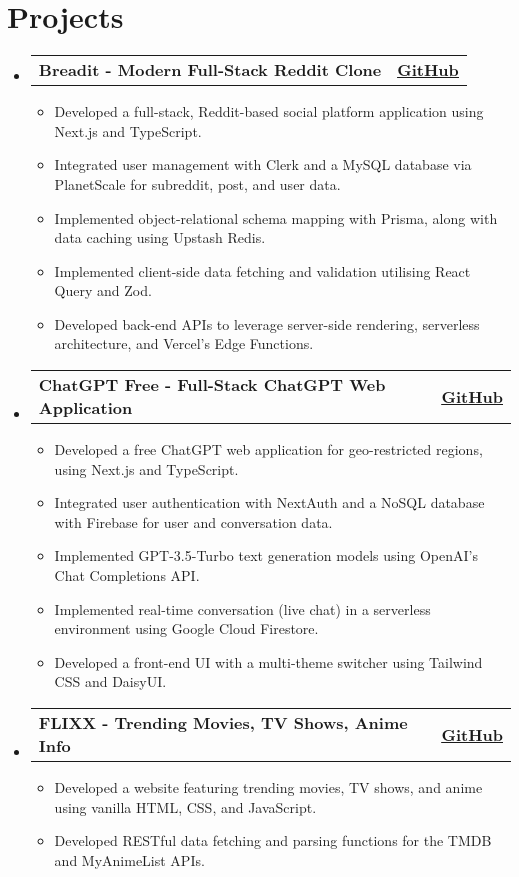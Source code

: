 \documentclass[letterpaper,11pt]{article}
\makeatletter
\newcommand{\resumeItem}[1]{
  \item\small{
    {#1 \vspace{-3pt}}
  }
}
\newcommand{\resumeProjectHeading}[2]{
  \vspace{-3pt}\item
    \begin{tabular*}{1.0\textwidth}[t]{l@{\extracolsep{\fill}}r}
      \textbf{#1} & \textbf{\small #2} \\
    \end{tabular*}\vspace{-7pt}
}
\newcommand{\resumeSubHeadingListStart}{\begin{itemize}[leftmargin=0.0in, label={}]}
\newcommand{\resumeSubHeadingListEnd}{\end{itemize}}
\newcommand{\resumeItemListStart}{\begin{itemize}}
\newcommand{\resumeItemListEnd}{\end{itemize}\vspace{0pt}}
\makeatother
\begin{document}
\section{Projects} 
    \resumeSubHeadingListStart
        \resumeProjectHeading
        {Breadit - Modern Full-Stack Reddit Clone}
        {\href{https://github.com/larryh12/breadit}{\underline{GitHub}}}
        \resumeItemListStart
            \resumeItem{Developed a full-stack, Reddit-based social platform application using Next.js and TypeScript.}
	    \resumeItem{Integrated user management with Clerk and a MySQL database via PlanetScale for subreddit, post, and user data.}
	    \resumeItem{Implemented object-relational schema mapping with Prisma, along with data caching using Upstash Redis.}
	    \resumeItem{Implemented client-side data fetching and validation utilising React Query and Zod.}
	    \resumeItem{Developed back-end APIs to leverage server-side rendering, serverless architecture, and Vercel’s Edge Functions.}
        \resumeItemListEnd
        \resumeProjectHeading
        {ChatGPT Free - Full-Stack ChatGPT Web Application}
        {\href{https://github.com/larryh12/chatgpt-free}{\underline{GitHub}}}
        \resumeItemListStart
            \resumeItem{Developed a free ChatGPT web application for geo-restricted regions, using Next.js and TypeScript.}
	    \resumeItem{Integrated user authentication with NextAuth and a NoSQL database with Firebase for user and conversation data.}
	    \resumeItem{Implemented GPT-3.5-Turbo text generation models using OpenAI’s Chat Completions API.}
	    \resumeItem{Implemented real-time conversation (live chat) in a serverless environment using Google Cloud Firestore.}
	    \resumeItem{Developed a front-end UI with a multi-theme switcher using Tailwind CSS and DaisyUI.}
        \resumeItemListEnd
        \resumeProjectHeading
        {FLIXX - Trending Movies, TV Shows, Anime Info}
        {\href{https://github.com/larryh12/flixx-app}{\underline{GitHub}}}
        \resumeItemListStart
            \resumeItem{Developed a website featuring trending movies, TV shows, and anime using vanilla HTML, CSS, and JavaScript.}
	    \resumeItem{Developed RESTful data fetching and parsing functions for the TMDB and MyAnimeList APIs.}
        \resumeItemListEnd
    \resumeSubHeadingListEnd


\end{document}
